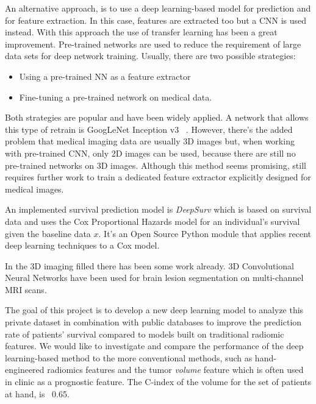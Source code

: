 An alternative approach, is to use a deep learning-based model for prediction and for feature
extraction. In this case, features are extracted too but a \acrshort{CNN} 
is used instead. With this approach the use of transfer learning has been a
great improvement. Pre-trained networks are used to reduce the requirement of large data
sets for deep network training. Usually, there are two possible strategies: 
\begin{itemize}[noitemsep, topsep=0pt]
  \item Using a pre-trained NN as a feature extractor
  \item Fine-tuning a pre-trained network on medical data.
\end{itemize}

Both strategies are popular and have been widely applied. A network that allows this type
of retrain is GoogLeNet Inception v3
~\cites{neural:goog-le-net}{neural:retrain}{neural:inception-retrain}.
However, there's the added problem that medical imaging data are usually 3D images but, 
when working with pre-trained CNN, only 2D images can be used, because there are still no 
pre-trained networks on 3D images. Although this method seems promising, still requires 
further work to train a dedicated feature extractor explicitly designed for medical images.
~\cite{medical:deep-learning-radiomics-gbm}

An implemented survival prediction model is \emph{DeepSurv} which is based on survival data
and uses the Cox Proportional Hazards model for an individual's survival given the baseline data
\( x \). It's an Open Source Python module that applies recent deep learning techniques 
to a Cox model.
~\cites{medical:deep-surv}{medical:cox}

In the 3D imaging filled there has been some work already. 3D Convolutional Neural Networks have
been used for brain lesion segmentation on multi-channel MRI scans. \cite{neural:3d-cnn-crf}


The goal of this project is to develop a new deep learning model to analyze this private 
dataset in combination with public databases to improve the prediction rate of patients' 
survival compared to models built on traditional radiomic features. We would like to 
investigate and compare the performance of the deep learning-based method 
to the more conventional methods, such as hand-engineered radiomics features and the tumor 
\emph{volume} feature which is often used in clinic as a prognostic feature. The C-index 
of the volume for the set of patients at hand, is ~0.65.

